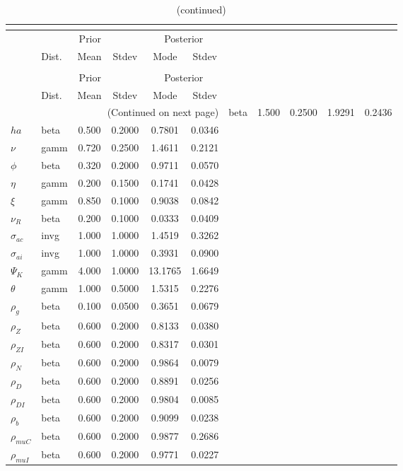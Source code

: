  
\begin{center}
\begin{longtable}{llcccc} 
\caption{Results from posterior maximization (parameters)}\\
 \label{Table:Posterior:1}\\
\toprule 
  & \multicolumn{3}{c}{Prior}  &  \multicolumn{2}{c}{Posterior} \\
  \cmidrule(r{.75em}){2-4} \cmidrule(r{.75em}){5-6}
  & Dist. & Mean  & Stdev & Mode & Stdev \\ 
\midrule \endfirsthead 
\caption{(continued)}\\
 \bottomrule 
  & \multicolumn{3}{c}{Prior}  &  \multicolumn{2}{c}{Posterior} \\
  \cmidrule(r{.75em}){2-4} \cmidrule(r{.75em}){5-6}
  & Dist. & Mean  & Stdev & Mode & Stdev \\ 
\midrule \endhead 
\bottomrule \multicolumn{6}{r}{(Continued on next page)}\endfoot 
\bottomrule\endlastfoot 
${\sigma}$ & beta &   1.500 & 0.2500 &   1.9291 &  0.2436 \\ 
${ha}$ & beta &   0.500 & 0.2000 &   0.7801 &  0.0346 \\ 
$\nu$ & gamm &   0.720 & 0.2500 &   1.4611 &  0.2121 \\ 
${\phi}$ & beta &   0.320 & 0.2000 &   0.9711 &  0.0570 \\ 
${\eta}$ & gamm &   0.200 & 0.1500 &   0.1741 &  0.0428 \\ 
$\xi$ & gamm &   0.850 & 0.1000 &   0.9038 &  0.0842 \\ 
${\nu_R}$ & beta &   0.200 & 0.1000 &   0.0333 &  0.0409 \\ 
${\sigma_{ac}}$ & invg &   1.000 & 1.0000 &   1.4519 &  0.3262 \\ 
${\sigma_{ai}}$ & invg &   1.000 & 1.0000 &   0.3931 &  0.0900 \\ 
${\Psi_{K}}$ & gamm &   4.000 & 1.0000 &  13.1765 &  1.6649 \\ 
${\theta}$ & gamm &   1.000 & 0.5000 &   1.5315 &  0.2276 \\ 
${\rho_g}$ & beta &   0.100 & 0.0500 &   0.3651 &  0.0679 \\ 
${\rho_Z}$ & beta &   0.600 & 0.2000 &   0.8133 &  0.0380 \\ 
${\rho_{ZI}}$ & beta &   0.600 & 0.2000 &   0.8317 &  0.0301 \\ 
${\rho_N}$ & beta &   0.600 & 0.2000 &   0.9864 &  0.0079 \\ 
${\rho_D}$ & beta &   0.600 & 0.2000 &   0.8891 &  0.0256 \\ 
${\rho_{DI}}$ & beta &   0.600 & 0.2000 &   0.9804 &  0.0085 \\ 
${\rho_b}$ & beta &   0.600 & 0.2000 &   0.9099 &  0.0238 \\ 
${\rho_{muC}}$ & beta &   0.600 & 0.2000 &   0.9877 &  0.2686 \\ 
${\rho_{muI}}$ & beta &   0.600 & 0.2000 &   0.9771 &  0.0227 \\ 
\end{longtable}
 \end{center}
